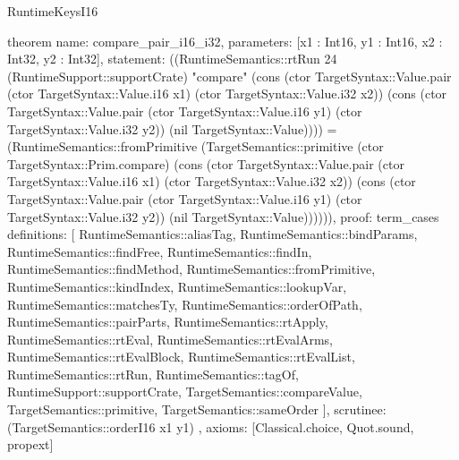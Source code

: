 \begin{lexlean}{RuntimeKeysI16}
\begin{semanticmodule}
theorem{
  name: compare_pair_i16_i32,
  parameters: [x1 : Int16, y1 : Int16, x2 : Int32, y2 : Int32],
  statement: ((RuntimeSemantics::rtRun 24 (RuntimeSupport::supportCrate) "compare" (cons (ctor TargetSyntax::Value.pair (ctor TargetSyntax::Value.i16 x1) (ctor TargetSyntax::Value.i32 x2)) (cons (ctor TargetSyntax::Value.pair (ctor TargetSyntax::Value.i16 y1) (ctor TargetSyntax::Value.i32 y2)) (nil TargetSyntax::Value)))) = (RuntimeSemantics::fromPrimitive (TargetSemantics::primitive (ctor TargetSyntax::Prim.compare) (cons (ctor TargetSyntax::Value.pair (ctor TargetSyntax::Value.i16 x1) (ctor TargetSyntax::Value.i32 x2)) (cons (ctor TargetSyntax::Value.pair (ctor TargetSyntax::Value.i16 y1) (ctor TargetSyntax::Value.i32 y2)) (nil TargetSyntax::Value)))))),
  proof: term_cases{
    definitions: [
      RuntimeSemantics::aliasTag,
      RuntimeSemantics::bindParams,
      RuntimeSemantics::findFree,
      RuntimeSemantics::findIn,
      RuntimeSemantics::findMethod,
      RuntimeSemantics::fromPrimitive,
      RuntimeSemantics::kindIndex,
      RuntimeSemantics::lookupVar,
      RuntimeSemantics::matchesTy,
      RuntimeSemantics::orderOfPath,
      RuntimeSemantics::pairParts,
      RuntimeSemantics::rtApply,
      RuntimeSemantics::rtEval,
      RuntimeSemantics::rtEvalArms,
      RuntimeSemantics::rtEvalBlock,
      RuntimeSemantics::rtEvalList,
      RuntimeSemantics::rtRun,
      RuntimeSemantics::tagOf,
      RuntimeSupport::supportCrate,
      TargetSemantics::compareValue,
      TargetSemantics::primitive,
      TargetSemantics::sameOrder
    ],
    scrutinee: (TargetSemantics::orderI16 x1 y1)
  },
  axioms: [Classical.choice, Quot.sound, propext]
}


\end{semanticmodule}
\end{lexlean}
